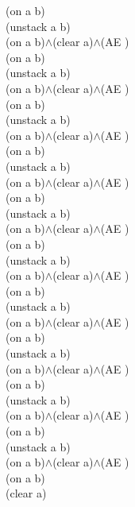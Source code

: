{{(on a b)\\
(unstack a b)\\
(on a b)$\wedge$(clear a)$\wedge$(AE )\\
(on a b)\\
(unstack a b)\\
(on a b)$\wedge$(clear a)$\wedge$(AE )\\
(on a b)\\
(unstack a b)\\
(on a b)$\wedge$(clear a)$\wedge$(AE )\\
(on a b)\\
(unstack a b)\\
(on a b)$\wedge$(clear a)$\wedge$(AE )\\
(on a b)\\
(unstack a b)\\
(on a b)$\wedge$(clear a)$\wedge$(AE )\\
(on a b)\\
(unstack a b)\\
(on a b)$\wedge$(clear a)$\wedge$(AE )\\
(on a b)\\
(unstack a b)\\
(on a b)$\wedge$(clear a)$\wedge$(AE )\\
(on a b)\\
(unstack a b)\\
(on a b)$\wedge$(clear a)$\wedge$(AE )\\
(on a b)\\
(unstack a b)\\
(on a b)$\wedge$(clear a)$\wedge$(AE )\\
(on a b)\\
(unstack a b)\\
(on a b)$\wedge$(clear a)$\wedge$(AE )\\
(on a b)\\
(clear a)\\
}%
}

